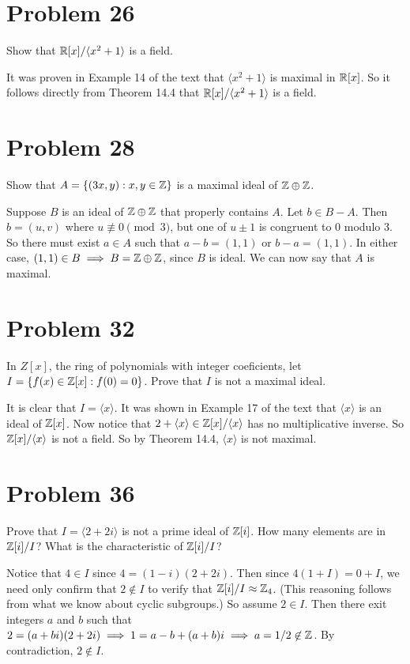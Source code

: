 \documentclass{article}
\begin{document}
\section*{Problem 26}

Show that $\mathbb{R}[x]/\langle x^2+1\rangle$ is a field.

It was proven in Example 14 of the text that $\langle x^2+1\rangle$
is maximal in $\mathbb{R}[x]$.  So it follows directly from Theorem 14.4
that $\mathbb{R}[x]/\langle x^2+1\rangle$ is a field.

\section*{Problem 28}

Show that $A=\{(3x,y):x,y\in\mathbb{Z}\}$ is a maximal ideal of $\mathbb{Z}\oplus\mathbb{Z}$.

Suppose $B$ is an ideal of $\mathbb{Z}\oplus\mathbb{Z}$ that properly contains $A$.
Let $b\in B-A$.  Then $b=(u,v)$ where $u\not\equiv 0\pmod{3}$, but
one of $u\pm 1$ is congruent to 0 modulo 3.  So there must exist $a\in A$ such
that $a-b=(1,1)$ or $b-a=(1,1)$.  In either case,
$(1,1)\in B\implies B=\mathbb{Z}\oplus\mathbb{Z}$, since $B$ is ideal.
We can now say that $A$ is maximal.

\section*{Problem 32}

In $Z[x]$, the ring of polynomials with integer coeficients, let
$I=\{f(x)\in\mathbb{Z}[x]:f(0)=0\}$.  Prove that $I$ is not a maximal ideal.

It is clear that $I=\langle x\rangle$.
It was shown in Example 17 of the text that
$\langle x\rangle$ is an ideal of $\mathbb{Z}[x]$.
Now notice that $2+\langle x\rangle\in\mathbb{Z}[x]/\langle x\rangle$
has no multiplicative inverse.  So $\mathbb{Z}[x]/\langle x\rangle$ is
not a field.  So by Theorem 14.4, $\langle x\rangle$ is not maximal.

\section*{Problem 36}

Prove that $I=\langle 2+2i\rangle$ is not a prime ideal of $\mathbb{Z}[i]$.
How many elements are in $\mathbb{Z}[i]/I$?  What is the characteristic of $\mathbb{Z}[i]/I$?

Notice that $4\in I$ since $4=(1-i)(2+2i)$.  Then since $4(1+I)=0+I$, we
need only confirm that $2\not\in I$ to verify that $\mathbb{Z}[i]/I\approx\mathbb{Z}_4$.
(This reasoning follows from what we know about cyclic subgroups.)
So assume $2\in I$.  Then there exit integers $a$ and $b$ such that
$2=(a+bi)(2+2i)\implies 1=a-b+(a+b)i\implies a=1/2\not\in\mathbb{Z}$.
By contradiction, $2\not\in I$.
\end{document}
